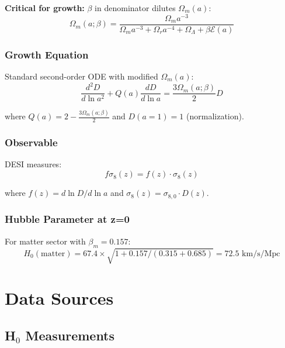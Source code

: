 \documentclass[11pt]{article}
\begin{document}
\textbf{Critical for growth:} $\beta$ in denominator dilutes $\Omega_m(a)$:
\begin{equation}
\Omega_m(a; \beta) = \frac{\Omega_m a^{-3}}{\Omega_m a^{-3} + \Omega_r a^{-4} + \Omega_\Lambda + \beta \mathcal{E}(a)}
\end{equation}

\subsubsection{Growth Equation}

Standard second-order ODE with modified $\Omega_m(a)$:
\begin{equation}
\frac{d^2 D}{d\ln a^2} + Q(a) \frac{dD}{d\ln a} = \frac{3\Omega_m(a; \beta)}{2} D
\end{equation}

where $Q(a) = 2 - \frac{3\Omega_m(a; \beta)}{2}$ and $D(a=1) = 1$ (normalization).

\subsubsection{Observable}

DESI measures:
\begin{equation}
f\sigma_8(z) = f(z) \cdot \sigma_8(z)
\end{equation}

where $f(z) = d \ln D / d \ln a$ and $\sigma_8(z) = \sigma_{8,0} \cdot D(z)$.

\subsubsection{Hubble Parameter at z=0}

For matter sector with $\beta_m = 0.157$:
\begin{equation}
H_0(\text{matter}) = 67.4 \times \sqrt{1 + 0.157/(0.315 + 0.685)} = 72.5 \text{ km/s/Mpc}
\end{equation}

\section{Data Sources}

\subsection{H$_0$ Measurements}
\end{document}
